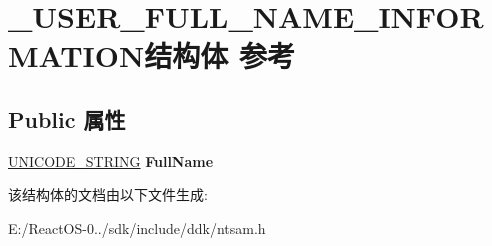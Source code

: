 \hypertarget{struct___u_s_e_r___f_u_l_l___n_a_m_e___i_n_f_o_r_m_a_t_i_o_n}{}\section{\+\_\+\+U\+S\+E\+R\+\_\+\+F\+U\+L\+L\+\_\+\+N\+A\+M\+E\+\_\+\+I\+N\+F\+O\+R\+M\+A\+T\+I\+O\+N结构体 参考}
\label{struct___u_s_e_r___f_u_l_l___n_a_m_e___i_n_f_o_r_m_a_t_i_o_n}
\subsection*{Public 属性}
\begin{DoxyCompactItemize}
\item 
\mbox{\label{struct___u_s_e_r___f_u_l_l___n_a_m_e___i_n_f_o_r_m_a_t_i_o_n_aa2c87f7bf105021ec6c385cfd6b48a7d}} 
\hyperlink{struct___u_n_i_c_o_d_e___s_t_r_i_n_g}{U\+N\+I\+C\+O\+D\+E\+\_\+\+S\+T\+R\+I\+NG} {\bfseries Full\+Name}
\end{DoxyCompactItemize}


该结构体的文档由以下文件生成\+:\begin{DoxyCompactItemize}
\item 
E\+:/\+React\+O\+S-\/0../sdk/include/ddk/ntsam.\+h\end{DoxyCompactItemize}

